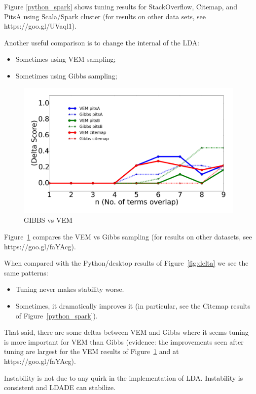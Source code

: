 \documentclass[twocolumn,5p,sort&compress]{elsarticle}
\newcommand{\bi}{\begin{itemize}}
\newcommand{\ei}{\end{itemize}}
\theoremstyle{break}
\begin{document}
Figure \ref{python_spark} shows tuning results for StackOverflow, Citemap, and PitsA 
   using Scala/Spark cluster (for results on other data sets, see https://goo.gl/UVaql1).
   
  Another useful comparison is to change the internal of the LDA:
  \bi
\item Sometimes using VEM sampling;
\item Sometimes using Gibbs sampling;
  \ei


\begin{figure}[!b]
  \captionsetup{justification=centering}
  \includegraphics[width=\linewidth]{./fig/gibbs_vem1.png}
  \caption{GIBBS vs VEM}
  \label{gibbs_vem}
\end{figure}


  Figure~\ref{gibbs_vem} compares the  VEM vs Gibbs sampling (for results on other datasets, see https://goo.gl/faYAcg).
   
   When compared with the Python/desktop results of
   Figure~\ref{fig:delta} we see the same patterns:
   \bi
 \item Tuning never makes stability worse.
 \item Sometimes, it dramatically improves it (in particular, see the Citemap results
   of  Figure~\ref{python_spark}).
   \ei
   That said, there are some deltas between VEM and Gibbs where it seems tuning
   is more important for VEM than Gibbs (evidence: the improvements seen after
   tuning are largest for the  VEM results of  Figure~\ref{gibbs_vem} and at  https://goo.gl/faYAcg).

\begin{lesson}
  Instability is not due to any quirk in the implementation of LDA. Instability is consistent and LDADE can stabilize. 
\end{lesson}
\end{document}
